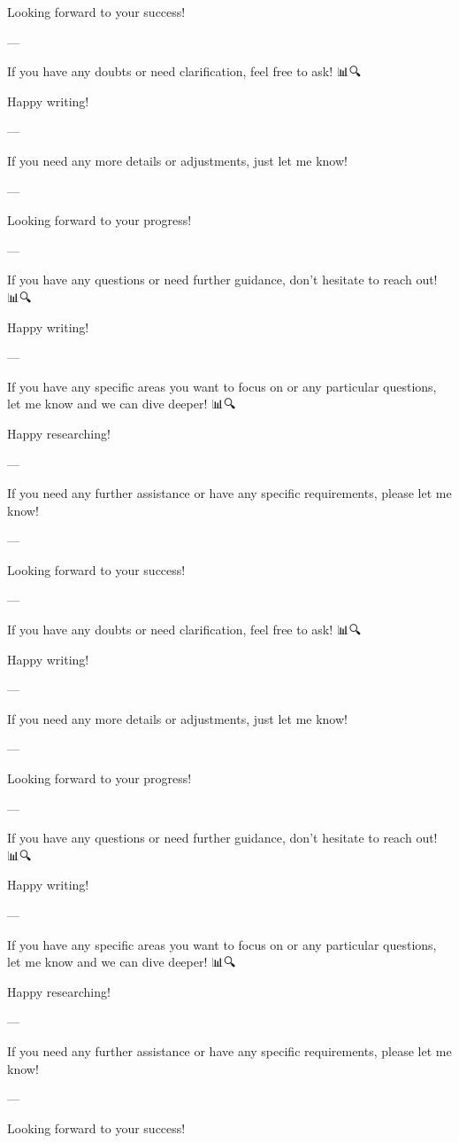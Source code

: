 Looking forward to your success! 🚀🌟

--- 

If you have any doubts or need clarification, feel free to ask! 📊🔍

Happy writing! 📝✨

--- 

If you need any more details or adjustments, just let me know! 🙌

--- 

Looking forward to your progress! 🚀🌟

--- 

If you have any questions or need further guidance, don't hesitate to reach out! 📊🔍

Happy writing! 📝✨

--- 

If you have any specific areas you want to focus on or any particular questions, let me know and we can dive deeper! 📊🔍

Happy researching! 📝🚀

--- 

If you need any further assistance or have any specific requirements, please let me know! 🙌

--- 

Looking forward to your success! 🚀🌟

--- 

If you have any doubts or need clarification, feel free to ask! 📊🔍

Happy writing! 📝✨

--- 

If you need any more details or adjustments, just let me know! 🙌

--- 

Looking forward to your progress! 🚀🌟

--- 

If you have any questions or need further guidance, don't hesitate to reach out! 📊🔍

Happy writing! 📝✨

--- 

If you have any specific areas you want to focus on or any particular questions, let me know and we can dive deeper! 📊🔍

Happy researching! 📝🚀

--- 

If you need any further assistance or have any specific requirements, please let me know! 🙌

--- 

Looking forward to your success! 🚀🌟

